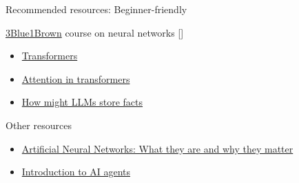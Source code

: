 \documentclass[10pt]{beamer}
\newcommand{\citeme}[1]{{\xspace\color{scAqua} \scriptsize [\cite{#1}]}}
\begin{document}
\begin{frame}{Recommended resources: Beginner-friendly}
	\begin{block}{\href{https://www.youtube.com/playlist?list=PLZHQObOWTQDNU6R1_67000Dx_ZCJB-3pi}{3Blue1Brown} course on neural networks\citeme{Sanderson2024}}
	\begin{itemize}
		\item \href{https://www.youtube.com/watch?v=wjZofJX0v4M&list=PLZHQObOWTQDNU6R1_67000Dx_ZCJB-3pi&index=6}{Transformers}
		\item \href{https://www.youtube.com/watch?v=eMlx5fFNoYc&list=PLZHQObOWTQDNU6R1_67000Dx_ZCJB-3pi&index=7}{Attention in transformers}
		\item \href{https://www.youtube.com/watch?v=9-Jl0dxWQs8&list=PLZHQObOWTQDNU6R1_67000Dx_ZCJB-3pi&index=8}{How might LLMs store facts}
	\end{itemize}
\end{block}
	\begin{block}{Other resources}
	\begin{itemize}
		\item \href{https://www.sas.com/en_us/insights/analytics/neural-networks.html}{Artificial Neural Networks: What they are and why they matter}
		\item \href{https://huggingface.co/learn/agents-course/en/unit1/introduction}{Introduction to AI agents}

	\end{itemize}
	\end{block}
\end{frame}
\end{document}
